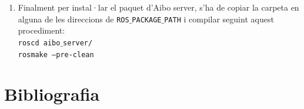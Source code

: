 \documentclass[12pt,a4paper,final,twoside]{article}
\begin{document}
\begin{enumerate}
\item Finalment per instal·lar el paquet d'Aibo server, s'ha de copiar la carpeta en alguna de les direccions de \texttt{ROS$\_$PACKAGE$\_$PATH} i compilar seguint aquest procediment:\\
\texttt{roscd aibo$\_$server/}\\
\texttt{rosmake --pre-clean}

\end{enumerate}

\section{Bibliografia}
\end{document}
